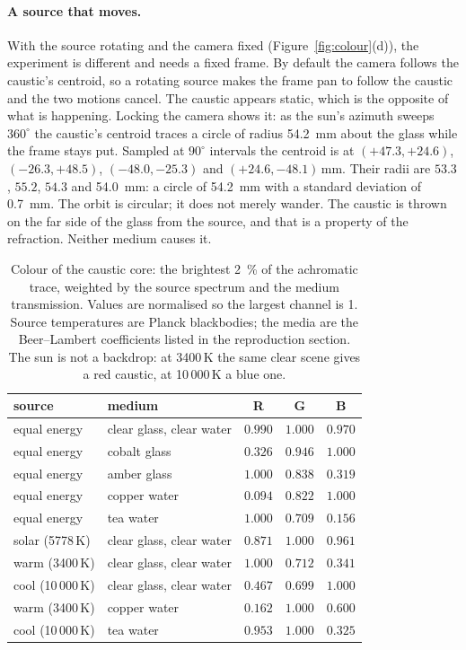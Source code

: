 \paragraph{A source that moves.}
With the source rotating and the camera fixed (Figure~\ref{fig:colour}(d)), the experiment is different and needs a fixed frame. By default the camera follows the
caustic's centroid, so a rotating source makes the frame pan to follow the caustic
and the two motions cancel. The caustic appears static, which is the opposite of
what is happening. Locking the camera shows it: as the sun's azimuth sweeps
$360^\circ$ the caustic's centroid traces a circle of radius
\SI{54.2}{\milli\meter} about the glass while the frame stays put. Sampled at
$90^\circ$ intervals the centroid is at $(+47.3,+24.6)$, $(-26.3,+48.5)$,
$(-48.0,-25.3)$ and $(+24.6,-48.1)$\,mm. Their radii are $53.3$, $55.2$, $54.3$ and
\SI{54.0}{\milli\meter}: a circle of \SI{54.2}{\milli\meter} with a standard
deviation of \SI{0.7}{\milli\meter}. The orbit is circular; it does not merely wander. The caustic is thrown on the far side of the glass from the source, and
that is a property of the refraction. Neither medium causes it.

\begin{table}[tbp]
\centering
\caption{Colour of the caustic core: the brightest \SI{2}{\percent} of the
achromatic trace, weighted by the source spectrum and the medium transmission.
Values are normalised so the largest channel is 1. Source temperatures are Planck
blackbodies; the media are the Beer--Lambert coefficients listed in the
reproduction section. The sun is not a backdrop: at 3400\,K the same clear scene
gives a red caustic, at 10\,000\,K a blue one.}
\label{tab:colour}
\footnotesize
\begin{tabular}{llccc}
\hline
source & medium & R & G & B \\
\hline
equal energy & clear glass, clear water & $0.990$ & $1.000$ & $0.970$ \\
equal energy & cobalt glass & $0.326$ & $0.946$ & $1.000$ \\
equal energy & amber glass & $1.000$ & $0.838$ & $0.319$ \\
equal energy & copper water & $0.094$ & $0.822$ & $1.000$ \\
equal energy & tea water & $1.000$ & $0.709$ & $0.156$ \\
\hline
solar (5778\,K) & clear glass, clear water & $0.871$ & $1.000$ & $0.961$ \\
warm (3400\,K) & clear glass, clear water & $1.000$ & $0.712$ & $0.341$ \\
cool (10\,000\,K) & clear glass, clear water & $0.467$ & $0.699$ & $1.000$ \\
\hline
warm (3400\,K) & copper water & $0.162$ & $1.000$ & $0.600$ \\
cool (10\,000\,K) & tea water & $0.953$ & $1.000$ & $0.325$ \\
\hline
\end{tabular}
\end{table}

